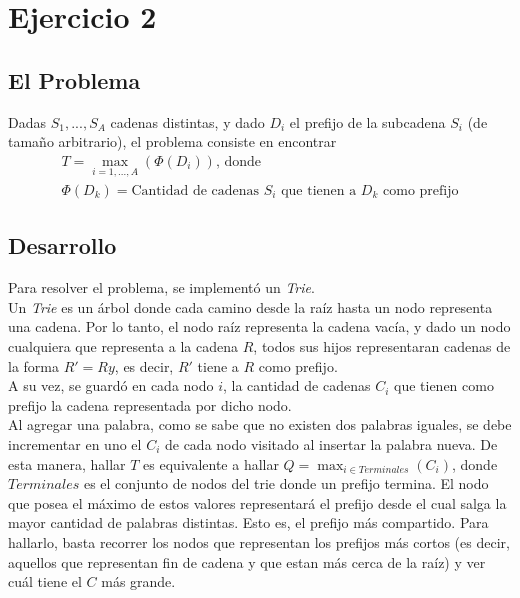 \section{Ejercicio 2}
\subsection{El Problema}
Dadas $S_1,...,S_A$ cadenas distintas, y dado $D_i$ el prefijo de la subcadena $S_i$ (de tamaño arbitrario), el problema consiste en encontrar 
\begin{gather*}
T = \operatorname*{max}_{i = 1,...,A} (\Phi(D_i))\text{, donde}\\
\Phi(D_k) = \text{Cantidad de cadenas $S_i$ que tienen a $D_k$ como prefijo}
\end{gather*}

\subsection{Desarrollo}
Para resolver el problema, se implementó un \emph{Trie}.\\
Un \emph{Trie} es un árbol donde cada camino desde la raíz hasta un nodo representa una cadena. Por lo tanto, el nodo raíz representa la cadena vacía, y dado un nodo cualquiera que representa a la cadena $R$, todos sus hijos representaran cadenas de la forma $R' = Ry$, es decir, $R'$ tiene a $R$ como prefijo.\\
A su vez, se guardó en cada nodo $i$, la cantidad de cadenas $C_i$ que tienen como prefijo la cadena representada por dicho nodo.\\
Al agregar una palabra, como se sabe que no existen dos palabras iguales, se debe incrementar en uno el $C_i$ de cada nodo visitado al insertar la palabra nueva. 
De esta manera, hallar $T$ es equivalente a hallar $\displaystyle Q = \operatorname*{max}_{i \in Terminales} (C_i)$, donde $Terminales$ es el conjunto de nodos del trie donde un prefijo termina. El nodo que posea el m\'aximo de estos valores representar\'a el prefijo desde el cual salga la mayor cantidad de palabras distintas. Esto es, el prefijo m\'as compartido. Para hallarlo, basta recorrer los nodos que representan los prefijos más cortos (es decir, aquellos que representan fin de cadena y que estan más cerca de la raíz) y ver cuál tiene el $C$ más grande.

